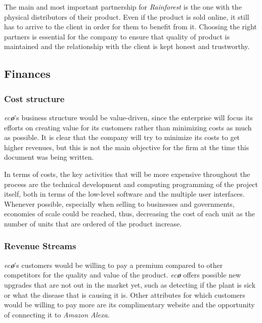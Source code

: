 \documentclass[english,runningheads,a4paper]{llncs}[2018/03/10]
\begin{document}
        The main and most important partnership for \textit{Rainforest} is the
        one with the physical distributors of their product. Even if the product
        is sold online, it still has to arrive to the client in order for them
        to benefit from it. Choosing the right partners is essential for the
        company to ensure that quality of product is maintained and the
        relationship with the client is kept honest and trustworthy.
    

    \subsection*{Finances}

        \subsubsection*{Cost structure}

        \textit{ec\textbf{\o}}'s business structure would be value-driven, since
        the enterprise will focus its efforts on creating value for its
        customers rather than minimizing costs as much as possible. It is clear
        that the company will try to minimize its costs to get higher revenues,
        but this is not the main objective for the firm at the time this
        document was being written.

        In terms of costs, the key activities that will be more expensive
        throughout the process are the technical development and computing
        programming of the project itself, both in terms of the low-level
        software and the multiple user interfaces. Whenever possible, especially
        when selling to businesses and governments, economies of scale could be
        reached, thus, decreasing the cost of each unit as the number of units
        that are ordered of the product increase.


        \subsubsection*{Revenue Streams}

        \textit{ec\textbf{\o}}'s customers would be willing to pay a premium
        compared to other competitors for the quality and value of the product.
        \textit{ec\textbf{\o}} offers possible new upgrades that are not out in
        the market yet, such as detecting if the plant is sick or what the
        disease that is causing it is. Other attributes for which customers
        would be willing to pay more are its complimentary website and the
        opportunity of connecting it to \textit{Amazon Alexa}.
\end{document}
